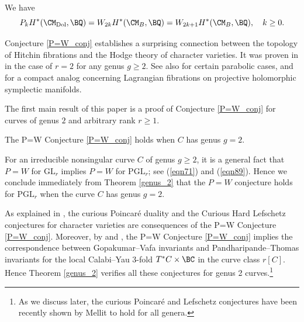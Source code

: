 \begin{conj}[\cite{dCHM1} P=W]
\notready \label{P=W_conj}
We have
\[
P_kH^\ast(\CM_{\mathrm{Dol}}, \BQ) = W_{2k}H^\ast(\CM_{B}, \BQ)= W_{2k+1}H^\ast(\CM_{B}, \BQ), \quad k \geq 0.
\]
\end{conj}

Conjecture \ref{P=W_conj} establishes a surprising connection between the topology of Hitchin fibrations and the Hodge theory of character varieties. It was proven in \cite{dCHM1} in the case of $r=2$ for any genus $g \geq 2$. See also \cite{dCHM3,SZ,Z} for certain parabolic cases, and \cite{SY,HLSY} for a compact analog concerning Lagrangian fibrations on projective holomorphic symplectic manifolds.

The first main result of this paper is a proof of Conjecture \ref{P=W_conj} for curves of genus $2$ and arbitrary rank $r\geq 1$.

\begin{thm}
\notready\label{genus_2}
The P=W
Conjecture \ref{P=W_conj} holds when $C$ has genus $g=2$.
\end{thm}

For an irreducible nonsingular curve $C$ of genus $g \geq 2$, it is a general fact that $P=W$ for $\mathrm{GL}_r$ implies $P=W$ for $\mathrm{PGL}_r$; see (\ref{eqn71}) and (\ref{eqn89}). Hence we conclude immediately from Theorem \ref{genus_2} that the $P=W$ conjecture holds for $\mathrm{PGL}_r$ when the curve $C$ has genus $g=2$.

As explained in \cite[Section 1]{dCHM1}, the curious Poincar\'e duality and the Curious Hard Lefschetz conjectures \cite[Conjectures 4.2.4 and 4.2.7]{HRV} for character varieties are consequences of the P=W Conjecture \ref{P=W_conj}.  Moreover, by \cite{CDP} and \cite[Section 9.3]{MT}, the P=W Conjecture \ref{P=W_conj} implies the correspondence between Gopakumar--Vafa invariants and Pandharipande--Thomas invariants \cite[Conjecture 3.13]{MT} for the local Calabi--Yau 3-fold $T^*C \times \BC$ in the curve class $r[C]$. Hence Theorem \ref{genus_2} verifies all these conjectures for genus 2 curves.\footnote{As we discuss later, the curious Poincar\'e and Lefschetz conjectures have been recently shown by Mellit \cite{Mellit} to hold for all genera.}


